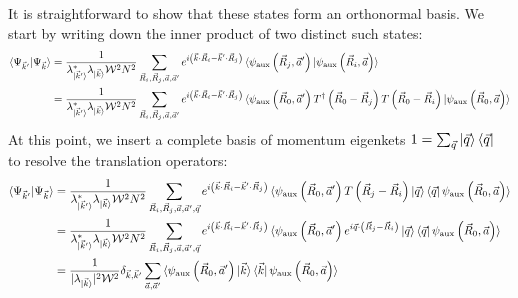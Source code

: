 \documentclass{report}
\numberwithin{equation}{section}
\begin{document}
\begin{appendices}
It is straightforward to show that these states form an orthonormal basis. We start by writing down the inner product of two distinct such states:
\begin{equation}\begin{aligned}
	\braket{\Psi_{\vec k^\prime} | \Psi_{\vec k}} 
	&= \frac{1}{\lambda_{\ket{\vec k^\prime}}^* \lambda_{\ket{\vec k}} \mathcal{W}^2 N^2}\sum_{\vec R_i, \vec R_j, \vec a, \vec a^\prime} e^{i \left(\vec{k}\cdot\vec{R}_i - \vec{k}^\prime\cdot\vec{R}_j\right) } \braket{\psi_\text{aux}\left( \vec R_j, \vec a^\prime \right) | \psi_\text{aux}\left( \vec R_i, \vec a \right)} \\
	&= \frac{1}{\lambda_{\ket{\vec k^\prime}}^* \lambda_{\ket{\vec k}} \mathcal{W}^2 N^2}\sum_{\vec R_i, \vec R_j, \vec a, \vec a^\prime} e^{i \left(\vec{k}\cdot\vec{R}_i - \vec{k}^\prime\cdot\vec{R}_j\right) } \braket{\psi_\text{aux}\left( \vec R_0, \vec a^\prime \right) T^\dagger\left( \vec R_0 - \vec R_j \right) T\left( \vec R_0 - \vec R_i \right) | \psi_\text{aux}\left( \vec R_0, \vec a \right)}\\
\end{aligned}\end{equation}
At this point, we insert a complete basis of momentum eigenkets \(1 = \sum_{\vec q}\ket{\vec q}\bra{\vec q}\) to resolve the translation operators:
\begin{equation}\begin{aligned}
	\braket{\Psi_{\vec k^\prime} | \Psi_{\vec k}} &= \frac{1}{\lambda_{\ket{\vec k^\prime}}^* \lambda_{\ket{\vec k}} \mathcal{W}^2 N^2}\sum_{\vec R_i, \vec R_j, \vec a, \vec a^\prime, \vec q} e^{i \left(\vec{k}\cdot\vec{R}_i - \vec{k}^\prime\cdot\vec{R}_j\right) } \braket{\psi_\text{aux}\left( \vec R_0, \vec a^\prime \right) T\left( \vec R_j - \vec R_i \right) \ket{\vec q}\bra{\vec q} \psi_\text{aux}\left( \vec R_0, \vec a \right)}\\
						      &= \frac{1}{\lambda_{\ket{\vec k^\prime}}^* \lambda_{\ket{\vec k}} \mathcal{W}^2 N^2}\sum_{\vec R_i, \vec R_j, \vec a, \vec a^\prime, \vec q} e^{i \left(\vec{k}\cdot\vec{R}_i - \vec{k}^\prime\cdot\vec{R}_j\right) } \braket{\psi_\text{aux}\left( \vec R_0, \vec a^\prime \right) e^{i \vec q \cdot \left( \vec R_j - \vec R_i \right)} \ket{\vec q}\bra{\vec q} \psi_\text{aux}\left( \vec R_0, \vec a \right)} \\
						      &= \frac{1}{|\lambda_{\ket{\vec k}}|^2 \mathcal{W}^2} \delta_{\vec k, \vec k^\prime}\sum_{\vec a, \vec a^\prime}\braket{\psi_\text{aux}\left( \vec R_0, \vec a^\prime \right) \ket{\vec k}\bra{\vec k} \psi_\text{aux}\left( \vec R_0, \vec a \right)}\\

\end{aligned}
\end{equation}
\end{appendices}
\end{document}
